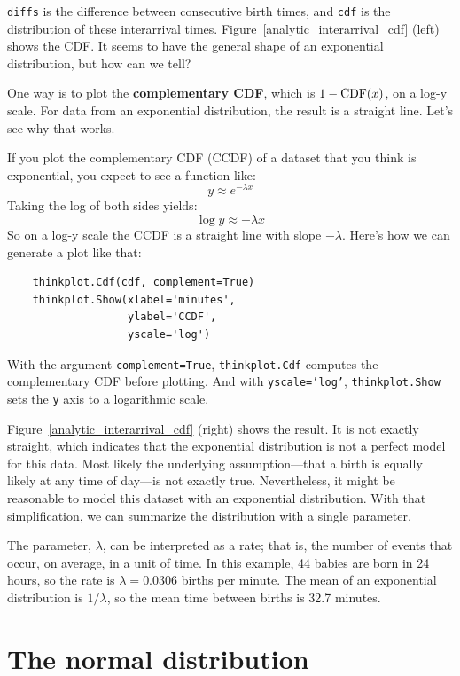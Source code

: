 \documentclass[12pt]{book}
\begin{document}
{\tt diffs} is the difference between consecutive birth times, and
{\tt cdf} is the distribution of these interarrival times.
Figure~\ref{analytic_interarrival_cdf} (left) shows the CDF.  It seems
to have the general shape of an exponential distribution, but how can
we tell?

One way is to plot the {\bf complementary CDF}, which is $1 - \mathrm{CDF}(x)$,
on a log-y scale.  For data from an exponential distribution, the
result is a straight line.  Let's see why that works.
  

If you plot the complementary CDF (CCDF) of a dataset that you think is
exponential, you expect to see a function like:
%
\[ y \approx e^{-\lambda x} \]
%
Taking the log of both sides yields:
%
\[ \log y \approx -\lambda x\]
%
So on a log-y scale the CCDF is a straight line
with slope $-\lambda$.  Here's how we can generate a plot like that:


\begin{verbatim}
    thinkplot.Cdf(cdf, complement=True)
    thinkplot.Show(xlabel='minutes',
                   ylabel='CCDF',
                   yscale='log')
\end{verbatim}

With the argument {\tt complement=True}, {\tt thinkplot.Cdf} computes
the complementary CDF before plotting.  And with {\tt yscale='log'},
{\tt thinkplot.Show} sets the {\tt y} axis to a logarithmic scale.

Figure~\ref{analytic_interarrival_cdf} (right) shows the result.  It is not
exactly straight, which indicates that the exponential distribution is
not a perfect model for this data.  Most likely the underlying
assumption---that a birth is equally likely at any time of day---is
not exactly true.  Nevertheless, it might be reasonable to model this
dataset with an exponential distribution.  With that simplification, we can
summarize the distribution with a single parameter.

The parameter, $\lambda$, can be interpreted as a rate; that is, the
number of events that occur, on average, in a unit of time.  In this
example, 44 babies are born in 24 hours, so the rate is $\lambda =
0.0306$ births per minute.  The mean of an exponential distribution is
$1/\lambda$, so the mean time between births is 32.7 minutes.


\section{The normal distribution}
\label{normal}
\end{document}
